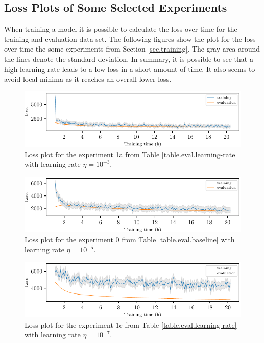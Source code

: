 \begin{appendices}
	\chapter{Loss Plots of Some Selected Experiments}\label{appendix.loss-plots}

	When training a model it is possible to calculate the loss over time for the training and evaluation data set. The following figures show the plot for the loss over time the some experiments from Section \ref{sec.training}. The gray area around the lines denote the standard deviation. In summary, it is possible to see that a high learning rate leads to a low loss in a short amount of time. It also seems to avoid local minima as it reaches an overall lower loss.

	\vfill

	\begin{figure}[H]
		\centering
		\includegraphics{figure/loss_plots/loss_plot_1a.pdf}
		\caption{Loss plot for the experiment 1a from Table \ref{table.eval.learning-rate} with learning rate $\eta=10^{-3}$.}
		\label{fig.loss-plot.1a}
	\end{figure}

	\vfill

	\begin{figure}[H]
		\centering
		\includegraphics{figure/loss_plots/loss_plot_0.pdf}
		\caption{Loss plot for the experiment 0 from Table \ref{table.eval.baseline} with learning rate $\eta=10^{-5}$.}
		\label{fig.loss-plot.0}
	\end{figure}

	\vfill

	\pagebreak

	\begin{figure}[H]
		\centering
		\includegraphics{figure/loss_plots/loss_plot_1c.pdf}
		\caption{Loss plot for the experiment 1c from Table \ref{table.eval.learning-rate} with learning rate $\eta=10^{-7}$.}
		\label{fig.loss-plot.1c}
	\end{figure}


\end{appendices}
